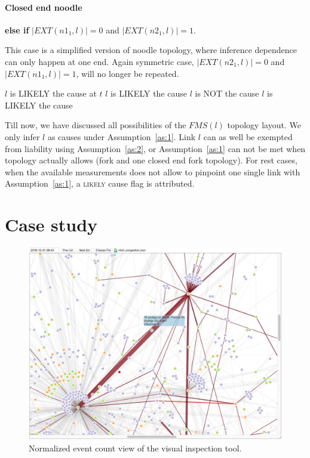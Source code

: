 \paragraph{Closed end noodle} \textbf{else if } $|EXT(n1_1,l)| = 0$ and $|EXT(n2_1,l)| = 1$.

This case is a simplified version of noodle topology, where inference dependence can only happen at one end.
Again symmetric case, $|EXT(n2_1,l)| = 0$ and $|EXT(n1_1,l)| = 1$, will no longer be repeated.

\begin{algorithmic}
	\State $l$ is LIKELY the cause at $t$ 
\Else {}
		\State $l$ is LIKELY the cause 
	\Else
			\State $l$ is NOT the cause 
		\Else
			\State $l$ is LIKELY the cause 
		\EndIf
	\EndIf
\EndIf
\end{algorithmic}

Till now, we have discussed all possibilities of the $FMS(l)$ topology layout. We only infer $l$ as causes under Assumption~\ref{as:1}. Link $l$ can as well be exempted from liability using Assumption~\ref{as:2}, or Assumption~\ref{as:1} can not be met when topology actually allows (fork and one closed end fork topology). For rest cases, when the available measurements does not allow to pinpoint one single link with Assumption~\ref{as:1}, a \textsc{likely} cause flag is attributed.

\section{Case study}

\begin{figure}[!htb]
\centering
\includegraphics[width=1\textwidth]{gfx/chap5/case_event_count.png}
\caption{Normalized event count view of the visual inspection tool.}
\label{fig:case_event_count}
\end{figure}

